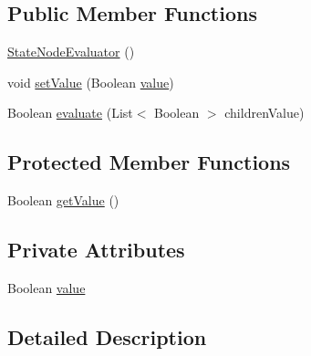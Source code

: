 \subsection*{Public Member Functions}
\begin{DoxyCompactItemize}
\item 
\hyperlink{classit_1_1emarolab_1_1cagg_1_1core_1_1language_1_1syntax_1_1expressionTree_1_1ExpressionNode_3_98df205ce8da64f1ea3f26a27a596721_a30a368a34be745e789a0c1ff02d51231}{State\-Node\-Evaluator} ()
\item 
void \hyperlink{classit_1_1emarolab_1_1cagg_1_1core_1_1language_1_1syntax_1_1expressionTree_1_1ExpressionNode_3_98df205ce8da64f1ea3f26a27a596721_ab0cbf235f245faeda09df00400e4a783}{set\-Value} (Boolean \hyperlink{classit_1_1emarolab_1_1cagg_1_1core_1_1language_1_1syntax_1_1expressionTree_1_1ExpressionNode_3_98df205ce8da64f1ea3f26a27a596721_a07d5958571f48ae0dd940f5d675e8bdf}{value})
\item 
Boolean \hyperlink{classit_1_1emarolab_1_1cagg_1_1core_1_1language_1_1syntax_1_1expressionTree_1_1ExpressionNode_3_98df205ce8da64f1ea3f26a27a596721_abb77c27a73a15c0f60037b43e1bf1e4b}{evaluate} (List$<$ Boolean $>$ children\-Value)
\end{DoxyCompactItemize}
\subsection*{Protected Member Functions}
\begin{DoxyCompactItemize}
\item 
Boolean \hyperlink{classit_1_1emarolab_1_1cagg_1_1core_1_1language_1_1syntax_1_1expressionTree_1_1ExpressionNode_3_98df205ce8da64f1ea3f26a27a596721_af075c54f6a6295bafd220a58632f26d6}{get\-Value} ()
\end{DoxyCompactItemize}
\subsection*{Private Attributes}
\begin{DoxyCompactItemize}
\item 
Boolean \hyperlink{classit_1_1emarolab_1_1cagg_1_1core_1_1language_1_1syntax_1_1expressionTree_1_1ExpressionNode_3_98df205ce8da64f1ea3f26a27a596721_a07d5958571f48ae0dd940f5d675e8bdf}{value}
\end{DoxyCompactItemize}


\subsection{Detailed Description}


